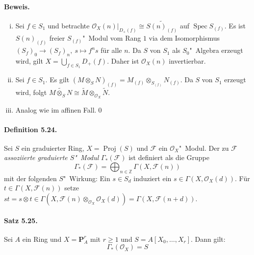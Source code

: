\paragraph{Beweis.}\begin{enumerate}[(i)]
\item Sei $f\in S_1$ und betrachte $\mathcal{O}_X(n)|_{D_+(f)}\cong\widetilde{S(n)_{(f)}}$ auf $\operatorname{Spec}S_{(f)}$. Es ist $S(n)_{(f)}$ freier $S_{(f)}$"~Modul vom Rang $1$ via dem Isomorphismus $(S_f)_0\to (S_f)_n,\ s\mapsto f^ns$ für alle $n$. Da $S$ von $S_1$ als $S_0$"~Algebra erzeugt wird, gilt $X=\bigcup_{f\in S_1}D_+(f)$. Daher ist $\mathcal{O}_X(n)$ invertierbar.
\item Sei $f\in S_1$. Es gilt $(M\otimes_SN)_{(f)}=M_{(f)}\otimes_{S_{(f)}}N_{(f)}$. Da $S$ von $S_1$ erzeugt wird, folgt $\widetilde{M\otimes_SN}\cong\widetilde{M}\otimes_{\mathcal{O}_X}\widetilde{N}$.
\item Analog wie im affinen Fall.\qed
\end{enumerate}

\paragraph{Definition 5.24.}\label{5.24} Sei $S$ ein graduierter Ring, $X=\operatorname{Proj}(S)$ und $\mathcal{F}$ ein $\mathcal{O}_X$"~Modul. Der zu $\mathcal{F}$ \textit{assoziierte graduierte $S$"~Modul} $\Gamma_\ast(\mathcal{F})$ ist definiert als die Gruppe
\[\Gamma_\ast(\mathcal{F})=\bigoplus_{n\in\mathbb{Z}}\Gamma(X,\mathcal{F}(n)) \]
mit der folgenden $S$"~Wirkung: Ein $s\in S_d$ induziert ein $s\in \Gamma(X,\mathcal{O}_X(d))$. Für $t\in\Gamma(X,\mathcal{F}(n))$ setze $st= s\otimes t\in\Gamma(X,\mathcal{F}(n)\otimes_{\mathcal{O}_X}\mathcal{O}_X(d))=\Gamma(X,\mathcal{F}(n+d))$.

\paragraph{Satz 5.25.}\label{5.25} Sei $A$ ein Ring und $X=\mathbf{P}_A^r$ mit $r\geq 1$ und $S=A[X_0,\ldots,X_r]$. Dann gilt:
\[\Gamma_\ast(\mathcal{O}_X)= S \]

